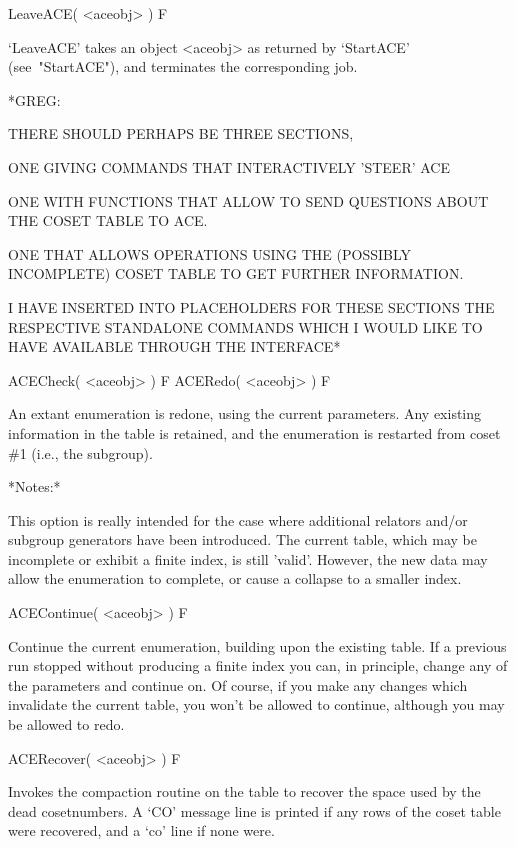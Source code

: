 \>LeaveACE( <aceobj> ) F

`LeaveACE' takes an object <aceobj> as returned by `StartACE'
(see~"StartACE"), and terminates the corresponding {\ACE} job.

\begintt
*GREG:

THERE SHOULD PERHAPS BE THREE SECTIONS, 

ONE GIVING COMMANDS THAT INTERACTIVELY 'STEER' ACE

ONE WITH FUNCTIONS THAT ALLOW  TO SEND QUESTIONS ABOUT THE COSET TABLE
TO ACE.

ONE THAT ALLOWS OPERATIONS USING THE (POSSIBLY INCOMPLETE) COSET TABLE
TO GET FURTHER INFORMATION.

I HAVE  INSERTED INTO PLACEHOLDERS  FOR THESE SECTIONS  THE RESPECTIVE
STANDALONE COMMANDS WHICH  I WOULD LIKE TO HAVE  AVAILABLE THROUGH THE
INTERFACE*
\endtt



\>ACECheck( <aceobj> ) F
\>ACERedo( <aceobj> ) F

An extant  enumeration is redone,  using the current  parameters.  Any
existing information in the table  is retained, and the enumeration is
restarted from coset \#1 (i.e., the subgroup).

*Notes:*

This option is really intended  for the case where additional relators
and/or subgroup  generators have been introduced.   The current table,
which may be  incomplete or exhibit a finite  index, is still 'valid'.
However, the new data may  allow the enumeration to complete, or cause
a collapse to a smaller index.

\>ACEContinue( <aceobj> ) F

Continue the  current enumeration,  building upon the  existing table.
If a previous run stopped without producing a finite index you can, in
principle, change any  of the parameters and continue  on.  Of course,
if you make any changes  which invalidate the current table, you won't
be allowed to continue, although you may be allowed to redo.


\>ACERecover( <aceobj> ) F

Invokes the compaction routine on  the table to recover the space used
by the dead  cosetnumbers. A `CO' message line is  printed if any rows
of the coset table were recovered,  and a `co' line if none were. 

